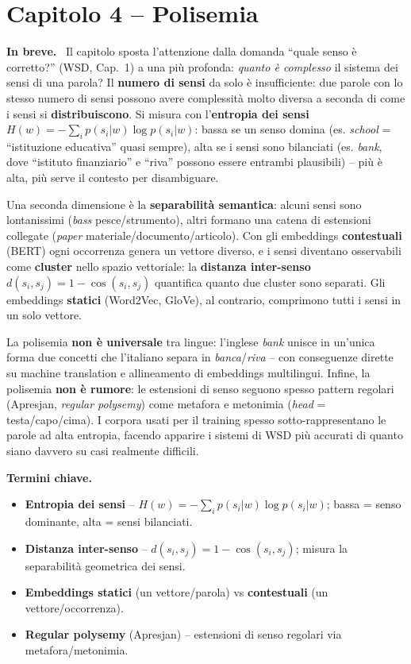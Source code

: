 \documentclass[11pt,a4paper]{article}
\newcommand{\spiega}{\medskip\noindent\textbf{\textcolor{blue!45!black}{In breve.}}\ }
\newcommand{\termini}{\medskip\noindent\textbf{\textcolor{blue!45!black}{Termini chiave.}}}
\begin{document}
\section*{Capitolo 4 -- Polisemia}

\spiega
Il capitolo sposta l'attenzione dalla domanda ``quale senso \`e corretto?'' (WSD, Cap.~1) a una pi\`u profonda: \emph{quanto \`e complesso} il sistema dei sensi di una parola? Il \textbf{numero di sensi} da solo \`e insufficiente: due parole con lo stesso numero di sensi possono avere complessit\`a molto diversa a seconda di come i sensi si \textbf{distribuiscono}. Si misura con l'\textbf{entropia dei sensi} $H(w)=-\sum_i p(s_i|w)\log p(s_i|w)$: bassa se un senso domina (es. \emph{school} = ``istituzione educativa'' quasi sempre), alta se i sensi sono bilanciati (es. \emph{bank}, dove ``istituto finanziario'' e ``riva'' possono essere entrambi plausibili) -- pi\`u \`e alta, pi\`u serve il contesto per disambiguare.

Una seconda dimensione \`e la \textbf{separabilit\`a semantica}: alcuni sensi sono lontanissimi (\emph{bass} pesce/strumento), altri formano una catena di estensioni collegate (\emph{paper} materiale/documento/articolo). Con gli embeddings \textbf{contestuali} (BERT) ogni occorrenza genera un vettore diverso, e i sensi diventano osservabili come \textbf{cluster} nello spazio vettoriale: la \textbf{distanza inter-senso} $d(s_i,s_j)=1-\cos(s_i,s_j)$ quantifica quanto due cluster sono separati. Gli embeddings \textbf{statici} (Word2Vec, GloVe), al contrario, comprimono tutti i sensi in un solo vettore.

La polisemia \textbf{non \`e universale} tra lingue: l'inglese \emph{bank} unisce in un'unica forma due concetti che l'italiano separa in \emph{banca}/\emph{riva} -- con conseguenze dirette su machine translation e allineamento di embeddings multilingui. Infine, la polisemia \textbf{non \`e rumore}: le estensioni di senso seguono spesso pattern regolari (Apresjan, \emph{regular polysemy}) come metafora e metonimia (\emph{head} = testa/capo/cima). I corpora usati per il training spesso sotto-rappresentano le parole ad alta entropia, facendo apparire i sistemi di WSD pi\`u accurati di quanto siano davvero su casi realmente difficili.

\termini
\begin{itemize}
\item \textbf{Entropia dei sensi} -- $H(w)=-\sum_i p(s_i|w)\log p(s_i|w)$; bassa = senso dominante, alta = sensi bilanciati.
\item \textbf{Distanza inter-senso} -- $d(s_i,s_j)=1-\cos(s_i,s_j)$; misura la separabilit\`a geometrica dei sensi.
\item \textbf{Embeddings statici} (un vettore/parola) vs \textbf{contestuali} (un vettore/occorrenza).
\item \textbf{Regular polysemy} (Apresjan) -- estensioni di senso regolari via metafora/metonimia.
\end{itemize}
\end{document}
